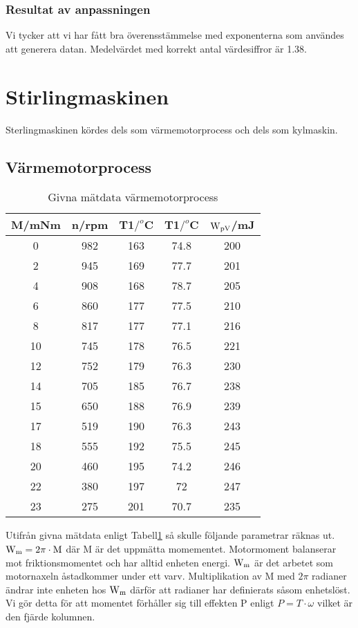 \documentclass[11pt,a4paper]{article}
\begin{document}
\begin{multicols}{2}
\subsubsection {Resultat av anpassningen}
Vi tycker att vi har fått bra överensstämmelse med exponenterna som användes
att generera datan.
Medelvärdet med korrekt antal värdesiffror är 1.38.
 \end{multicols}
\section{Stirlingmaskinen}
Sterlingmaskinen kördes dels som värmemotorprocess och dels som kylmaskin.
\subsection{Värmemotorprocess}

\begin{table}[h!]
\centering
\begin{tabular}{||c c c c c||} 
 \hline
 M/mNm & n/rpm & T1$/^{o}$C &T1$/^{o}$C& $\rm{W_{pV}}$/mJ\\ [0.5ex] 
\hline\hline
0	& 982 &	163	& 74.8 & 200 \\
2 &	945 &	169 &	77.7 &	201 \\
4	& 908 &	168 &	78.7 &	205 \\
6	& 860 &	177 &	77.5 &	210 \\
8	& 817	& 177	& 77.1 &	216 \\
10 &	745 &	178 &	76.5 & 221 \\
12 &	752&	179&	76.3&	230\\
14&	705&	185	&76.7&	238\\
15&	650&	188&	76.9&	239\\
17&	519&	190&	76.3&	243\\
18&	555&	192&	75.5&	245\\
20&	460&	195&	74.2&	246\\
22&	380&	197&	72&	247\\
23&	275&	201&	70.7&	235\\ [1ex] 
 \hline
\end{tabular}
\caption{Givna mätdata värmemotorprocess}
\label{table:1}
\end{table}
Utifrån givna mätdata enligt Tabell\ref{table:1} så skulle följande parametrar
räknas ut. 
$\rm{W_m}= 2\pi\cdot\rm{M}$ där M är det uppmätta momementet.
Motormoment balanserar mot friktionsmomentet och har alltid enheten energi.
$\rm{W_m}$ är det arbetet som motornaxeln åstadkommer under ett varv.
Multiplikation av M med $2\pi$ radianer ändrar inte enheten hos $\rm{W_m}$ 
därför att radianer har definierats såsom enhetslöst.
Vi gör detta för att momentet förhåller sig till effekten P enligt $P=T\cdot\omega$
vilket är den fjärde kolumnen.
\end{document}

